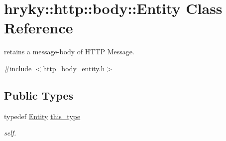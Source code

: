 \hypertarget{classhryky_1_1http_1_1body_1_1_entity}{\section{hryky\-:\-:http\-:\-:body\-:\-:Entity Class Reference}
\label{classhryky_1_1http_1_1body_1_1_entity}
}


retains a message-\/body of H\-T\-T\-P Message.  




{\ttfamily \#include $<$http\-\_\-body\-\_\-entity.\-h$>$}

\subsection*{Public Types}
\begin{DoxyCompactItemize}
\item 
\hypertarget{classhryky_1_1http_1_1body_1_1_entity_a2f6e32c9f4a71f736d8960863e75f36a}{typedef \hyperlink{classhryky_1_1http_1_1body_1_1_entity}{Entity} \hyperlink{classhryky_1_1http_1_1body_1_1_entity_a2f6e32c9f4a71f736d8960863e75f36a}{this\-\_\-type}}\label{classhryky_1_1http_1_1body_1_1_entity_a2f6e32c9f4a71f736d8960863e75f36a}

\begin{DoxyCompactList}\small\item\em self. \end{DoxyCompactList}\end{DoxyCompactItemize}
